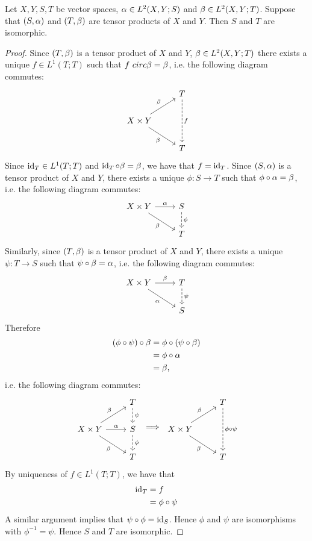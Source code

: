 \documentclass{book}
\begin{document}
	\begin{ex}
		Let $X, Y, S, T$ be vector spaces, $\alpha \in L^2(X, Y; S)$ and $\beta \in L^2(X, Y; T)$. Suppose that $(S, \alpha)$ and $(T, \beta)$ are tensor products of $X$ and $Y$. Then $S$ and $T$ are isomorphic. 
	\end{ex}
	
	\begin{proof}
		Since $(T, \beta)$ is a tensor product of $X$ and $Y$, $\beta \in L^2(X,Y; T)$ there exists a unique $f \in L^1(T;T)$ such that $f\ circ \beta = \beta$, i.e. the following diagram commutes: 
		\[ 
		\begin{tikzcd}
			& T \arrow[dd, dashed, "f"] \\
			X \times Y \arrow[ur, "\be"] \arrow[dr, "\be"'] 
			&   \\
			& T 
		\end{tikzcd}
		\] 
		Since $\operatorname{id}_T \in L^1(T;T)$ and $\operatorname{id}_T \circ \beta = \beta$, we have that $f = \operatorname{id}_T$. Since $(S, \alpha)$ is a tensor product of $X$ and $Y$, there exists a unique $\phi: S \rightarrow T$ such that $\phi \circ \alpha = \beta$, i.e. the following diagram commutes: 
		\[ 
		\begin{tikzcd}
			X \times Y \arrow[r, "\al"] \arrow[dr, "\be"'] 	
			& S  \arrow[d, dashed, "\phi"] \\
			& T 
		\end{tikzcd}
		\] 
		Similarly, since $(T, \beta)$ is a tensor product of $X$ and $Y$, there exists a unique $\psi: T \rightarrow S$ such that $\psi \circ \beta = \alpha$, i.e. the following diagram commutes: 
		\[ 
		\begin{tikzcd}
			X \times Y \arrow[r, "\be"] \arrow[dr, "\al"'] 	
			& T  \arrow[d, dashed, "\psi"] \\
			& S 
		\end{tikzcd}
		\] 
		Therefore 
		\begin{align*}
			(\phi \circ \psi) \circ \beta 
			& = \phi \circ (\psi \circ \beta) \\
			& = \phi \circ \alpha \\
			& = \beta, 
		\end{align*}
		i.e. the following diagram commutes:
		\[ 
		\begin{tikzcd}
			& T \arrow[d, dashed, "\psi"] \\
			X \times Y \arrow[ur, "\be"] \arrow[dr, "\be"'] \arrow[r, "\al"]	
			& S  \arrow[d, dashed, "\phi"] \\
			& T 
		\end{tikzcd}
		\implies
		\begin{tikzcd}
			& T \arrow[dd, dashed, "\phi \circ \psi"] \\
			X \times Y \arrow[ur, "\be"] \arrow[dr, "\be"'] 
			&  \\
			& T 
		\end{tikzcd}
		\] 
		By uniqueness of $f \in L^1(T;T)$, we have that 
		\begin{align*}
			\operatorname{id}_T
			& = f \\
			& = \phi \circ \psi 
		\end{align*}
		A similar argument implies that $\psi \circ \phi = \operatorname{id}_S$. Hence $\phi$ and $\psi$ are isomorphisms with $\phi^{-1} = \psi$. Hence $S$ and $T$ are isomorphic.
	\end{proof}
	
\end{document}
